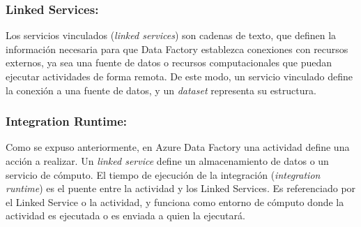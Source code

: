 \subsubsection{Linked Services:}

Los servicios vinculados (\emph{linked services}) son cadenas de texto, que definen la información necesaria 
para que Data Factory establezca conexiones con recursos externos, ya sea una fuente de datos o recursos computacionales 
que puedan ejecutar actividades de forma remota. De este modo, un servicio vinculado define la conexión a una fuente de 
datos, y un \emph{dataset} representa su estructura.

\subsubsection{Integration Runtime:}

Como se expuso anteriormente, en Azure Data Factory una actividad define una acci\'on a realizar. Un \emph{linked service} define 
un almacenamiento de datos o un servicio de cómputo. El tiempo de ejecución de la integración (\emph{integration runtime}) es el 
puente entre la actividad y los Linked Services. 
Es referenciado por el Linked Service o la actividad, y funciona como entorno de cómputo donde la actividad es ejecutada 
o es enviada a quien la ejecutar\'a. 